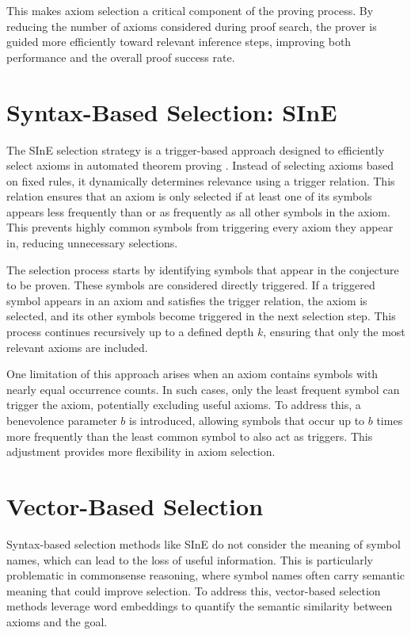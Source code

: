 \documentclass[english,version-2020-11]{uzl-thesis}
\begin{document}
This makes axiom selection a critical component of the proving process. By reducing the number of axioms considered during proof search, the prover is guided more efficiently toward relevant inference steps, improving both performance and the overall proof success rate.


\section{Syntax-Based Selection: SInE}

The SInE selection strategy is a trigger-based approach designed to efficiently select axioms in automated theorem proving \cite{Hoder2011}. Instead of selecting axioms based on fixed rules, it dynamically determines relevance using a trigger relation. This relation ensures that an axiom is only selected if at least one of its symbols appears less frequently than or as frequently as all other symbols in the axiom. This prevents highly common symbols from triggering every axiom they appear in, reducing unnecessary selections.

The selection process starts by identifying symbols that appear in the conjecture to be proven. These symbols are considered directly triggered. If a triggered symbol appears in an axiom and satisfies the trigger relation, the axiom is selected, and its other symbols become triggered in the next selection step. This process continues recursively up to a defined depth \( k \), ensuring that only the most relevant axioms are included.

One limitation of this approach arises when an axiom contains symbols with nearly equal occurrence counts. In such cases, only the least frequent symbol can trigger the axiom, potentially excluding useful axioms. To address this, a benevolence parameter \( b \) is introduced, allowing symbols that occur up to \( b \) times more frequently than the least common symbol to also act as triggers. This adjustment provides more flexibility in axiom selection.

\section{Vector-Based Selection}

Syntax-based selection methods like SInE do not consider the meaning of symbol names, which can lead to the loss of useful information. This is particularly problematic in commonsense reasoning, where symbol names often carry semantic meaning that could improve selection. To address this, vector-based selection methods leverage word embeddings to quantify the semantic similarity between axioms and the goal.
\end{document}
